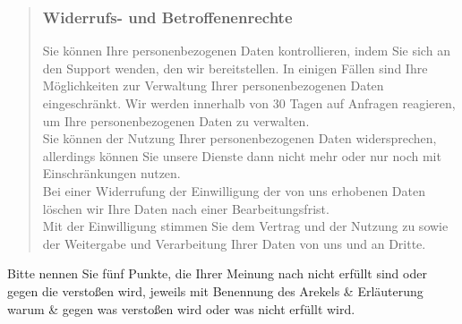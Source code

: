 \documentclass{exercisesheet}
\begin{document}
{\begin{quote}
    \subsubsection*{Widerrufs- und Betroffenenrechte}
    Sie können Ihre personenbezogenen Daten kontrollieren, indem Sie sich an den Support wenden, den wir bereitstellen. In einigen Fällen sind Ihre Möglichkeiten zur Verwaltung Ihrer personenbezogenen Daten eingeschränkt. Wir werden innerhalb von 30 Tagen auf Anfragen reagieren, um Ihre personenbezogenen Daten zu verwalten.\\
    Sie können der Nutzung Ihrer personenbezogenen Daten widersprechen, allerdings können Sie unsere Dienste dann nicht mehr oder nur noch mit Einschränkungen nutzen.\\
    Bei einer Widerrufung der Einwilligung der von uns erhobenen Daten löschen wir Ihre Daten nach einer Bearbeitungsfrist.
    \vspace{1em}\\
    Mit der Einwilligung stimmen Sie dem Vertrag und der Nutzung zu sowie der Weitergabe und Verarbeitung Ihrer Daten von uns und an Dritte.
  \end{quote}

  Bitte nennen Sie fünf Punkte, die Ihrer Meinung nach nicht erfüllt sind oder gegen die verstoßen wird, jeweils mit Benennung des Arekels \& Erläuterung warum \& gegen was verstoßen wird oder was nicht erfüllt wird.
}
\end{document}
